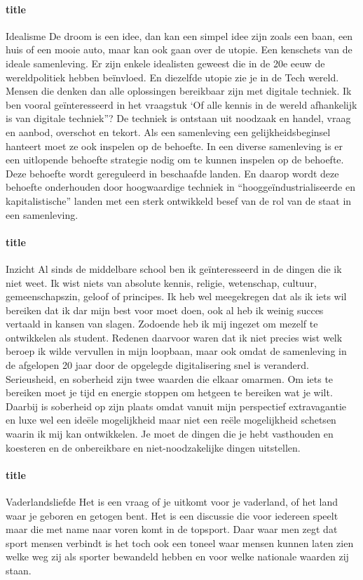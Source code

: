 \documentclass[11pt]{report}
\begin{document}
\paragraph{title}
Idealisme
De droom is een idee, dan kan een simpel idee zijn zoals een baan, een huis of een mooie auto, maar kan ook gaan over de utopie. Een kenschets van de ideale samenleving. Er zijn enkele idealisten geweest die in de 20e eeuw de wereldpolitiek hebben beïnvloed. En diezelfde utopie zie je in de Tech wereld. Mensen die denken dan alle oplossingen bereikbaar zijn met digitale techniek. Ik ben vooral geïnteresseerd in het vraagstuk ‘Of alle kennis in de wereld afhankelijk is van digitale techniek”? De techniek is ontstaan uit noodzaak en handel, vraag en aanbod, overschot en tekort. Als een samenleving een gelijkheidsbeginsel hanteert moet ze ook inspelen op de behoefte. In een diverse samenleving is er een uitlopende behoefte strategie nodig om te kunnen inspelen op de behoefte. Deze behoefte wordt gereguleerd in beschaafde landen. En daarop wordt deze behoefte onderhouden door hoogwaardige techniek in “hooggeïndustrialiseerde en kapitalistische” landen met een sterk ontwikkeld besef van de rol van de staat in een samenleving.

\paragraph{title}
Inzicht
Al sinds de middelbare school ben ik geïnteresseerd in de dingen die ik niet weet. Ik wist niets van absolute kennis, religie, wetenschap, cultuur, gemeenschapszin, geloof of principes. Ik heb wel meegekregen dat als ik iets wil bereiken dat ik dar mijn best voor moet doen, ook al heb ik weinig succes vertaald in kansen van slagen. Zodoende heb ik mij ingezet om mezelf te ontwikkelen als student. Redenen daarvoor waren dat ik niet precies wist welk beroep ik wilde vervullen in mijn loopbaan, maar ook omdat de samenleving in de afgelopen 20 jaar door de opgelegde digitalisering snel is veranderd.
Serieusheid, en soberheid zijn twee waarden die elkaar omarmen. Om iets te bereiken moet je tijd en energie stoppen om hetgeen te bereiken wat je wilt. Daarbij is soberheid op zijn plaats omdat vanuit mijn perspectief extravagantie en luxe wel een ideële mogelijkheid maar niet een reële mogelijkheid schetsen waarin ik mij kan ontwikkelen. Je moet de dingen die je hebt vasthouden en koesteren en de onbereikbare en niet-noodzakelijke dingen uitstellen.

\paragraph{title}
Vaderlandsliefde
Het is een vraag of je uitkomt voor je vaderland, of het land waar je geboren en getogen bent. Het is een discussie die voor iedereen speelt maar die met name naar voren komt in de topsport. Daar waar men zegt dat sport mensen verbindt is het toch ook een toneel waar mensen kunnen laten zien welke weg zij als sporter bewandeld hebben en voor welke nationale waarden zij staan.
\end{document}
